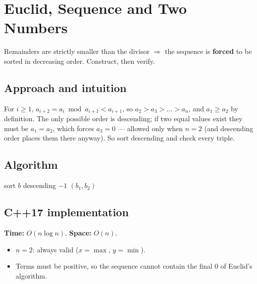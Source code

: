 \section{Euclid, Sequence and Two Numbers}
\label{sec:n-euclid-seq}


\begin{patternbox}
Remainders are strictly smaller than the divisor $\Rightarrow$ the sequence
is \textbf{forced} to be sorted in decreasing order. Construct, then verify.
\end{patternbox}

\subsection*{Approach and intuition}

For $i\ge1$, $a_{i+2}=a_i\bmod a_{i+1}<a_{i+1}$, so
$a_2>a_3>\dots>a_n$, and $a_1\ge a_2$ by definition. The only possible order is
descending; if two equal values exist they must be $a_1=a_2$, which forces
$a_3=0$ --- allowed only when $n=2$ (and descending order places them there
anyway). So sort descending and check every triple.

\subsection*{Algorithm}
\begin{algorithmic}[1]
\State sort $b$ descending
  \Return $-1$ \EndIf \EndFor
\State \Return $(b_1,b_2)$
\end{algorithmic}


\subsection*{C++17 implementation}

\begin{complexitybox}
\textbf{Time:} $O(n\log n)$. \textbf{Space:} $O(n)$.
\end{complexitybox}

\begin{pitfallbox}
\begin{itemize}
  \item $n=2$: always valid ($x=\max$, $y=\min$).
  \item Terms must be positive, so the sequence cannot contain the final $0$
        of Euclid's algorithm.
\end{itemize}
\end{pitfallbox}
